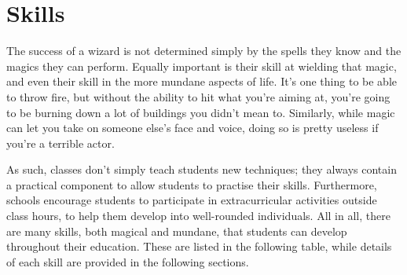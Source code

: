 \chapter{Skills}

The success of a wizard is not determined simply by the spells they know and the magics they can perform.
Equally important is their skill at wielding that magic, and even their skill in the more mundane aspects of life.
It's one thing to be able to throw fire, but without the ability to hit what you're aiming at, you're going to be burning down a lot of buildings you didn't mean to.
Similarly, while magic can let you take on someone else's face and voice, doing so is pretty useless if you're a terrible actor.

As such, classes don't simply teach students new techniques; they always contain a practical component to allow students to practise their skills.
Furthermore, schools encourage students to participate in extracurricular activities outside class hours, to help them develop into well-rounded individuals.
All in all, there are many skills, both magical and mundane, that students can develop throughout their education.
These are listed in the following table, while details of each skill are provided in the following sections.



